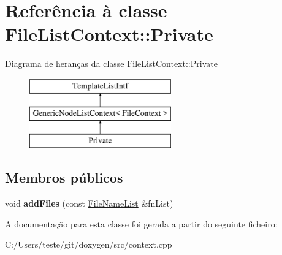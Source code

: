\hypertarget{class_file_list_context_1_1_private}{\section{Referência à classe File\-List\-Context\-:\-:Private}
\label{class_file_list_context_1_1_private}
}
Diagrama de heranças da classe File\-List\-Context\-:\-:Private\begin{figure}[H]
\begin{center}
\leavevmode
\includegraphics[height=3.000000cm]{class_file_list_context_1_1_private}
\end{center}
\end{figure}
\subsection*{Membros públicos}
\begin{DoxyCompactItemize}
\item 
\hypertarget{class_file_list_context_1_1_private_abf0981fd8cef63889c656802c26c18fd}{void {\bfseries add\-Files} (const \hyperlink{class_file_name_list}{File\-Name\-List} \&fn\-List)}\label{class_file_list_context_1_1_private_abf0981fd8cef63889c656802c26c18fd}

\end{DoxyCompactItemize}


A documentação para esta classe foi gerada a partir do seguinte ficheiro\-:\begin{DoxyCompactItemize}
\item 
C\-:/\-Users/teste/git/doxygen/src/context.\-cpp\end{DoxyCompactItemize}
